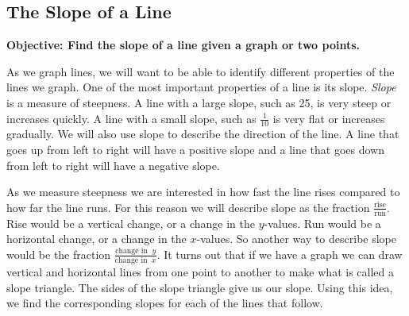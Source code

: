 \documentclass[12pt]{book}
\theoremstyle{definition}
\begin{document}
\subsection{The Slope of a Line}
{\bf Objective: Find the slope of a line given a graph or two points.}\par
As we graph lines, we will want to be able to identify different properties of the lines we graph. One of the most important properties of a line is its slope. {\it Slope} is a measure of steepness.  A line with a large slope, such as 25, is very steep or increases quickly. A line with a small slope, such as $\frac{1}{10}$ is very flat or increases gradually. We will also use slope to describe the direction of the line. A line that goes up from left to right will have a positive slope and a line that goes down from left to right will have a negative slope.\par
As we measure steepness we are interested in how fast the line rises compared to how far the line runs. For this reason we will describe slope as the fraction $\frac{\text{rise}}{\text{run}}$. Rise would be a vertical change, or a change in the $y$-values. Run would be a horizontal change, or a change in the $x$-values. So another way to describe slope would be the fraction $\frac{\text{change in }\ y}{\text{change in }\ x}$. It turns out that if we have a graph we can draw vertical and horizontal lines from one point to another to make what is called a slope triangle. The sides of the slope triangle give us our slope. Using this idea, we find the corresponding slopes for each of the lines that follow.
\end{document}
